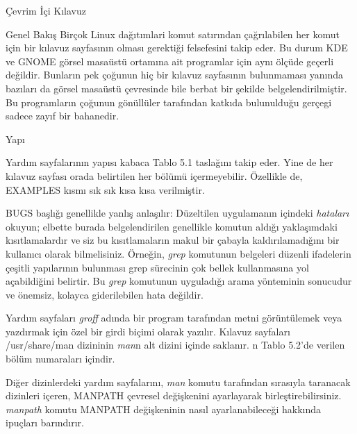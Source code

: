 \begin{section}{Çevrim İçi Kılavuz}
\begin{subsection}{Genel Bakış}
Birçok Linux dağıtımlari komut satırından çağrılabilen her komut için bir kılavuz sayfasının olması gerektiği felsefesini takip eder. Bu durum KDE ve GNOME görsel masaüstü ortamına ait programlar için aynı ölçüde geçerli değildir. Bunların pek çoğunun hiç bir kılavuz sayfasının bulunmaması yanında bazıları da görsel masaüstü çevresinde bile berbat bir şekilde belgelendirilmiştir. Bu programların çoğunun gönüllüler tarafından katkıda bulunulduğu gerçegi sadece zayıf bir bahanedir.
\end{subsection}
\begin{subsection}{Yapı}

Yardım sayfalarının yapısı kabaca Tablo 5.1 taslağını takip eder. Yine de her kılavuz sayfası orada belirtilen her bölümü içermeyebilir. Özellikle de, EXAMPLES kısmı sık sık kısa kısa verilmiştir.

BUGS başlığı genellikle yanlış anlaşılır: Düzeltilen uygulamanın içindeki \emph{hataları} okuyun; elbette burada belgelendirilen genellikle komutun aldığı yaklaşımdaki kısıtlamalardır ve siz bu kısıtlamaların makul bir çabayla kaldırılamadığını bir kullanıcı olarak bilmelisiniz. Örneğin, \emph{grep} komutunun belgeleri düzenli ifadelerin çeşitli yapılarının bulunması grep sürecinin çok bellek kullanmasına yol açabildiğini belirtir. Bu \emph{grep} komutunun uyguladığı arama yönteminin sonucudur ve önemsiz, kolayca giderilebilen hata değildir.    

Yardım sayfaları \emph{groff} adında bir program tarafından metni görüntülemek veya yazdırmak için özel bir girdi biçimi olarak yazılır. Kılavuz sayfaları /usr/share/man dizininin \emph{man}n alt dizini içinde saklanır. n Tablo 5.2'de verilen bölüm numaraları içindir.

Diğer dizinlerdeki yardım sayfalarını, \emph{man} komutu tarafından sırasıyla taranacak dizinleri içeren, MANPATH çevresel değişkenini ayarlayarak birleştirebilirsiniz. \emph{manpath} komutu MANPATH değişkeninin nasıl ayarlanabileceği hakkında ipuçları barındırır.

\end{subsection}
\end{section}
